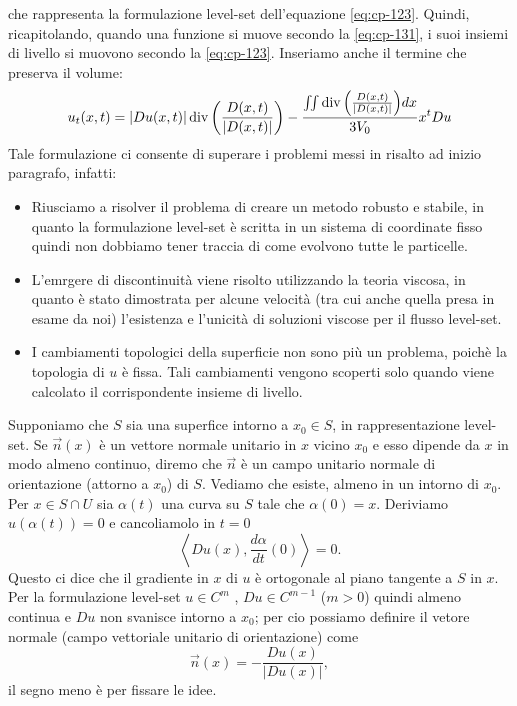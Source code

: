 che rappresenta la formulazione level-set dell'equazione \eqref{eq:cp-123}. 
Quindi, ricapitolando, quando una funzione si muove secondo la \eqref{eq:cp-131}, i suoi insiemi di livello si muovono secondo la \eqref{eq:cp-123}. Inseriamo anche il termine che preserva il volume:
\begin{equation}
  \label{eq:cp-132}
  u_t(x,t)=|Du(x,t)|\operatorname{div}{\left(\frac{D(x,t)}{|D(x,t)|}\right)}-\frac{\iint\operatorname{div}{\left(\frac{D(x,t)}{|D(x,t)|}\right)}dx}{3V_0}x^tDu
\end{equation}
 Tale formulazione ci consente di superare i problemi messi in risalto ad inizio paragrafo, infatti:
\begin{itemize}
  \item Riusciamo a risolver il problema di creare un metodo robusto e stabile, in quanto la formulazione level-set è scritta in un sistema di coordinate fisso quindi non dobbiamo tener traccia di come evolvono tutte le particelle.

  \item L'emrgere di discontinuità viene risolto utilizzando la teoria viscosa, in quanto è stato dimostrata per alcune velocità (tra cui anche quella presa in esame da noi) l'esistenza e l'unicità di soluzioni viscose per il flusso level-set.

   \item I cambiamenti topologici della superficie non sono più un problema, poichè la topologia di $u$ è fissa. Tali cambiamenti vengono scoperti solo quando viene calcolato il corrispondente insieme di livello. 

\end{itemize}

\begin{osservazione}
\label{oss:cp-131}
Supponiamo che $S$ sia una superfice intorno a $x_0\in S$, in rappresentazione level-set. Se $\vec{n}(x)$ è un vettore normale unitario in $x$ vicino $x_0$ e esso dipende da $x$ in modo almeno continuo, diremo che $\vec{n}$ è un campo unitario normale di orientazione (attorno a $x_0$) di $S$. Vediamo che esiste, almeno in un intorno di $x_0$. Per $x\in S\cap U$ sia $\alpha(t)$ una curva su $S$ tale che $\alpha(0)=x$. Deriviamo $u(\alpha(t)) = 0$ e cancoliamolo in $t=0$
\[
\left<Du(x),\frac{d\alpha}{dt}(0)\right> = 0.
\]
Questo ci dice che il gradiente in $x$ di $u$ è ortogonale al piano tangente a $S$ in $x$. Per la formulazione level-set $u\in C^m$ , $Du\in C^{m-1}$ ($m>0$) quindi almeno continua e $Du$ non svanisce intorno a $x_0$; per cio possiamo definire il vetore normale (campo vettoriale unitario di orientazione) come
\[
\vec{n}(x)=-\frac{Du(x)}{|Du(x)|},
\]
il segno meno è per fissare le idee.
\end{osservazione}

